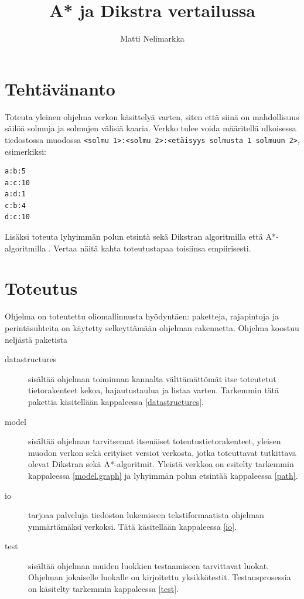 \documentclass[10pt,a4paper]{article}
\begin{document}
\title{A* ja Dikstra vertailussa}
\author{Matti Nelimarkka}

\setlength{\parindent}{0pt}
\setlength{\parskip}{10pt}

\maketitle

\newpage

\section*{Tehtävänanto}

Toteuta yleinen ohjelma verkon käsittelyä varten, siten että siinä on mahdollisuus säilöä solmuja ja solmujen välisiä kaaria. Verkko tulee voida määritellä ulkoisessa tiedostossa muodossa \texttt{<solmu 1>:<solmu 2>:<etäisyys solmusta 1 solmuun 2>}, esimerkiksi:

\begin{verbatim}
a:b:5
a:c:10
a:d:1
c:b:4
d:c:10
\end{verbatim}

Lisäksi toteuta lyhyimmän polun etsintä sekä Dikstran algoritmilla \cite{dikstra} että A*-algoritmilla \cite{astar}. Vertaa näitä kahta toteutustapaa toisiinsa empiirisesti.

\section{Toteutus}

Ohjelma on toteutettu oliomallinnusta hyödyntäen: paketteja, rajapintoja ja perintäsuhteita on käytetty selkeyttämään ohjelman rakennetta. Ohjelma koostuu neljästä paketista

\begin{description}
\item[datastructures] sisältää ohjelman toiminnan kannalta välttämättömät itse toteutetut tietorakenteet kekoa, hajautustaulua ja listaa varten. Tarkemmin tätä pakettia käsitellään kappaleessa \ref{datastructures}.
\item[model] sisältää ohjelman tarvitsemat itsenäiset toteutustietorakenteet, yleisen muodon verkon sekä erityiset versiot verkosta, jotka toteuttavat tutkittava olevat Dikstran sekä A*-algoritmit. Yleistä verkkoa on esitelty tarkemmin kappaleessa \ref{model.graph} ja lyhyimmän polun etsintää kappaleessa \ref{path}.
\item[io] tarjoaa palveluja tiedoston lukemiseen tekstiformaatista ohjelman ymmärtämäksi verkoksi. Tätä käsitellään kappaleessa \ref{io}.
\item[test] sisältää ohjelman muiden luokkien testaamiseen tarvittavat luokat. Ohjelman jokaiselle luokalle on kirjoitettu yksikkötestit. Testausprosessia on käsitelty tarkemmin kappaleessa \ref{test}.
\end{description}
\end{document}
